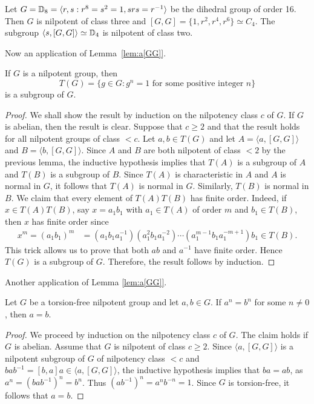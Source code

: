\begin{example}
	Let $G=\mathbb{D}_{8}=\langle r,s:r^{8}=s^2=1,srs=r^{-1}\rangle$ be the dihedral group of order 
	16. Then $G$ is nilpotent of class three and 
	$[G,G]=\{1,r^2,r^4,r^6\}\simeq C_4$. The subgroup $\langle
	s,[G,G]\rangle\simeq\mathbb{D}_4$ is nilpotent of class two.
\end{example}

Now an application of Lemma~\ref{lem:a[GG]}. 

\begin{theorem}
	\label{thm:T(nilpotent)}
	If $G$ is a nilpotent group, then 
	\[
	T(G)=\{g\in G:g^n=1\text{ for some positive integer }n\}
	\]
	is a subgroup of $G$. 
\end{theorem}

\begin{proof} 
    We shall show the result by induction on the nilpotency class $c$ of $G$.
    If $G$ is abelian, then the result is clear. Suppose that $c\geq 2$ and that the result holds for all nilpotent 
    groups of class $<c$. 
	Let $a,b\in T(G)$ and let $A=\langle a,[G,G]\rangle$ and $B=\langle b,[G,G]\rangle$. 
	Since $A$ and $B$ are both nilpotent of class $<2$ by the previous lemma, the inductive hypothesis implies that
	$T(A)$ is a subgroup of $A$ and $T(B)$ is a subgroup of $B$. 
	Since $T(A)$ is characteristic in $A$ and $A$ is normal in $G$, it follows that 
	$T(A)$ is
	normal in $G$. Similarly, $T(B)$ is normal in $B$.  
	We claim that every element of $T(A)T(B)$ has finite order. Indeed, if 
	$x\in T(A)T(B)$, say $x=a_1b_1$ with 
	$a_1\in T(A)$ of order $m$ and $b_1\in T(B)$, then $x$ has finite order since  
	\begin{align*}
	x^m=(a_1b_1)^m&=
		(a_1b_1a_1^{-1})(a_1^2b_1a_1^{-2})\cdots (a_1^{m-1} b_1 a_1^{-m+1})b_1\in T(B).
	\end{align*}
	This trick allows us to prove that both $ab$ and $a^{-1}$ have finite order. 
	Hence $T(G)$ is a subgroup of $G$.  Therefore, the result follows by induction. 
\end{proof}

Another application of Lemma \ref{lem:a[GG]}.

\begin{theorem}
	\label{thm:a=b}
	Let $G$ be a torsion-free nilpotent group and let $a,b\in G$. If $a^n=b^n$ for some 
	$n\ne 0$, then $a=b$.
\end{theorem}

\begin{proof}
	We proceed by induction on the nilpotency class $c$ of $G$. The claim holds if $G$ is abelian. Assume 
	that $G$ is nilpotent of class $c\geq2$. Since $\langle a,[G,G]\rangle$ is a nilpotent subgroup of
	$G$ of nilpotency class $<c$ and $bab^{-1}=[b,a]a\in \langle
	a,[G,G]\rangle$, the inductive hypothesis implies that $ba=ab$, as  
	$a^n=(bab^{-1})^n=b^n$. Thus $(ab^{-1})^n=a^nb^{-n}=1$. Since $G$ is torsion-free, it follows that $a=b$.
\end{proof}

